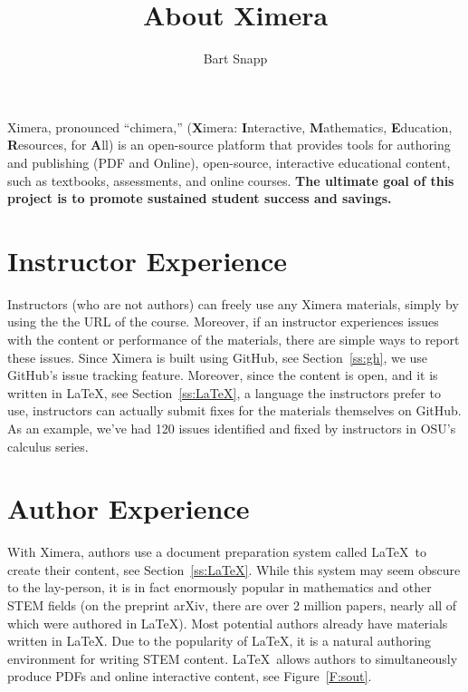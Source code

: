 \documentclass{ximera}
\author{Bart Snapp}
\title{About Ximera}
\begin{document}
Ximera, pronounced ``chimera,'' (\textbf{X}imera:
\textbf{I}nteractive, \textbf{M}athematics, \textbf{E}ducation,
\textbf{R}esources, for \textbf{A}ll) is an open-source platform that
provides tools for authoring and publishing (PDF and Online),
open-source, interactive educational content, such as
textbooks, assessments, and online courses.  
\textbf{The ultimate goal of this project is to promote sustained student success and savings.}





\section*{Instructor Experience}


Instructors (who are not authors) can freely use any Ximera materials,
simply by using the the URL of the course. Moreover, if an instructor
experiences issues with the content or performance of the materials,
there are simple ways to report these issues. Since Ximera is built
using GitHub, see Section~\ref{ss:gh}, we use GitHub's issue tracking
feature. Moreover, since the content is open, and it is written in
\LaTeX, see Section~\ref{ss:LaTeX}, a language the instructors prefer
to use, instructors can actually submit fixes for the materials
themselves on GitHub. As an example, we've had 120 issues identified
and fixed by instructors in OSU's calculus series.




\section*{Author Experience}


 
With Ximera, authors use a document preparation system called
\LaTeX\ to create their content, see Section~\ref{ss:LaTeX}.  While
this system may seem obscure to the lay-person, it is in fact
enormously popular in mathematics and other STEM fields (on the
preprint arXiv, there are over 2 million papers, nearly all of which
were authored in \LaTeX). Most potential authors already have
materials written in \LaTeX. Due to the popularity of \LaTeX, it is a
natural authoring environment for writing STEM content.
\LaTeX\ allows authors to simultaneously produce PDFs and online
interactive content, see Figure~\ref{F:sout}.
\end{document}
